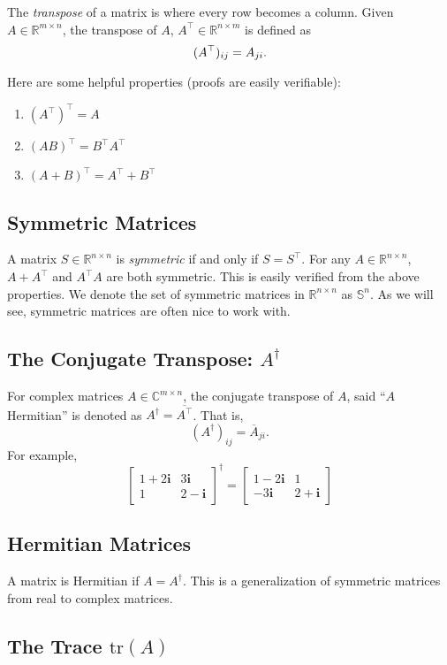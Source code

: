 \documentclass{article}
\newcommand{\1}{\mathbf{1}}
\newcommand{\tr}{\mathrm{tr}}
\newcommand{\0}{\mathbf{0}}
\newcommand{\ii}{\mathbf{i}}
\newcommand{\RR}{\mathbb{R}}
\newcommand{\CC}{\mathbb{C}}
\renewcommand{\SS}{\mathbb{S}}
\newcommand{\T}{\top}
\newcommand{\m}[1]{\begin{bmatrix} #1 \end{bmatrix}}
\begin{document}
The \textit{transpose} of a matrix is where every row becomes a column. Given
$A\in\RR^{m\times n}$, the transpose of $A$, $A^\T\in\RR^{n\times m}$ is defined
as
\[
    (A^\T)_{ij} = A_{ji}.\\
\]

Here are some helpful properties (proofs are easily verifiable):
\begin{enumerate}[-]
\item $(A^\T)^\T = A$
\item $(AB)^\T = B^\T A^\T$
\item $(A+B)^\T = A^\T + B^\T$
\end{enumerate}

\subsection{Symmetric Matrices}

A matrix $S\in\RR^{n\times n}$ is \textit{symmetric} if and only if
$S = S^\T$. For any $A\in\RR^{n\times n}$, $A+A^\T$ and $A^\T A$
are both symmetric. This is easily verified from the above properties.
We denote the set of symmetric matrices in $\RR^{n\times n}$ as $\SS^n$.
As we will see, symmetric matrices are often nice to work with.

\subsection{The Conjugate Transpose: $A^\dagger$}

For complex matrices $A\in\CC^{m\times n}$, the conjugate transpose of
$A$, said ``$A$ Hermitian'' is denoted as $A^\dagger = \overline{A^\T}$.
That is,
\[
    (A^\dagger)_{ij} = \overline{A}_{ji}.
\]
For example,
\[
    \m{1+2\ii & 3\ii\\ 1 & 2-\ii}^\dagger = \m{1-2\ii&1\\-3\ii&2+\ii}
\]

\subsection{Hermitian Matrices}

A matrix is Hermitian if $A = A^\dagger$. This is a generalization of symmetric
matrices from real to complex matrices.

\subsection{The Trace $\tr(A)$}
\end{document}

